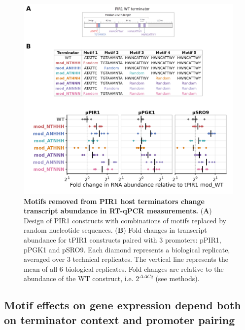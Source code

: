 \documentclass{SBCbookchapter}
\begin{document}
\begin{figure}[p]

{\centering \includegraphics[width=0.98\linewidth]{figures/tPIR1_design_and_qpcr.png} 

}

\caption{\textbf{Motifs removed from PIR1 host terminators change transcript abundance in RT-qPCR measurements.} (\textbf{A}) Design of PIR1 constructs with combinations of motifs replaced by random nucleotide sequences. (\textbf{B}) Fold changes in transcript abundance for tPIR1 constructs paired with 3 promoters: pPIR1, pPGK1 and pSRO9. Each diamond represents a biological replicate, averaged over 3 technical replicates. The vertical line represents the mean of all 6 biological replicates. Fold changes are relative to the abundance of the WT construct, i.e. $2^{\Delta\Delta Cq}$ (see methods).}\label{fig:tPIR1-design-and-qpcr}
\end{figure}

\subsection{Motif effects on gene expression depend both on terminator context and promoter pairing}
\end{document}
